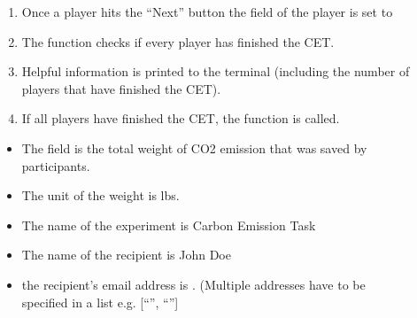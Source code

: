 \documentclass[letterpaper,10pt,english]{sphinxmanual}
\begin{document}
\begin{description}
\item[{}] \leavevmode\begin{enumerate}
%
\item {} 
Once a player hits the “Next” button the  field of the player is set to 

\item {} 
The  function checks if every player has finished the CET.

\item {} 
Helpful information is printed to the terminal (including the number of players that have finished the CET).

\item {} 
If all players have finished the CET, the  function is called.

\end{enumerate}

\item[{}] \leavevmode\begin{itemize}
\item {} 
The {\hyperref[\detokenize{Subsession_fields:sum-saved-emission-ref}]{}} field is the total weight of CO2 emission that was saved by participants.

\item {} 
The unit of the weight is lbs.

\item {} 
The name of the experiment is Carbon Emission Task

\item {} 
The name of the recipient is John Doe

\item {} 
the recipient’s email address is . (Multiple addresses have to be specified in a list
e.g. {[}“”, “”{]}

\end{itemize}

\end{description}
\end{document}

